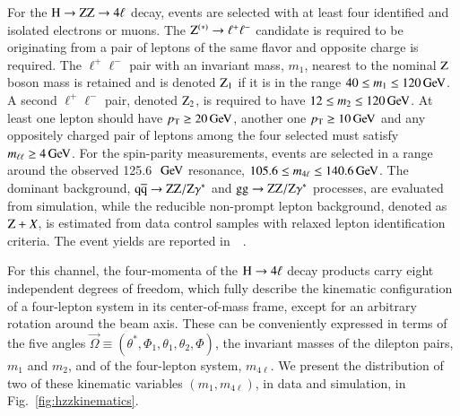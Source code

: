 For the $\mathrm{H}\to\mathrm{Z}\mathrm{Z}\to4\ell$ decay, events are selected with at least four
identified and isolated electrons or muons.  The $\mathrm{Z}^{(\ast)}\to
\ell^+\ell^-$ candidate is required to be originating from a pair of leptons of the same
flavor and opposite charge is required.  The $\ell^+\ell^-$ pair with
an invariant mass, $m_1$, nearest to the nominal $\mathrm{Z}$ boson mass is
retained and is denoted $\mathrm{Z}_{1}$ if it is in the range $40 \le m_1
\le 120 \,\mathrm{Ge\hspace{-.08em}V}$.  A second $\ell^{+}\ell^{-}$ pair, denoted $\mathrm{Z}_{2}$,
is required to have $12 \le m_2 \le 120 \,\mathrm{Ge\hspace{-.08em}V}$.  At least one lepton
should have $p_{\mathrm{T}} \ge 20 \,\mathrm{Ge\hspace{-.08em}V}$, another one $p_{\mathrm{T}} \ge 10 \,\mathrm{Ge\hspace{-.08em}V}$ and any
oppositely charged pair of leptons among the four selected must
satisfy $m_{\ell\ell} \ge 4 \,\mathrm{Ge\hspace{-.08em}V}$. For the spin-parity measurements,
events are selected in a range around the observed 125.6~$\,\mathrm{Ge\hspace{-.08em}V}$
resonance, $105.6 \le m_{4\ell} \le 140.6 \,\mathrm{Ge\hspace{-.08em}V}$.
%
The dominant background, $\mathrm{q}\mathrm{\overline{q}} \to \mathrm{Z}\mathrm{Z}/\mathrm{Z}\gamma^*$ and $\mathrm{g}\mathrm{g} \to
\mathrm{Z}\mathrm{Z}/\mathrm{Z}\gamma^*$ processes, are evaluated from simulation, while the
reducible non-prompt lepton background, denoted as $\mathrm{Z} + X$, is
estimated from data control samples with relaxed lepton identification
criteria.
%
The event yields are reported in~~\cite{Chatrchyan:2013mxa}.

For this channel, the four-momenta of the $\mathrm{H} \rightarrow
4\mathrm{\ell}$ decay products carry eight independent degrees of
freedom, which fully describe the kinematic configuration of a
four-lepton system in its center-of-mass frame, except for an
arbitrary rotation around the beam axis. These can be conveniently
expressed in terms of the five angles $\vec\Omega\equiv(\theta^*,
\Phi_1, \theta_1, \theta_2, \Phi)$, the invariant masses of the
dilepton pairs, $m_{1}$ and $m_{2}$, and of the four-lepton system,
$m_{4\ell}$.  We present the distribution of two of these kinematic
variables $(m_1, m_{4\ell})$, in data and simulation, in
Fig.~\ref{fig:hzzkinematics}. 


